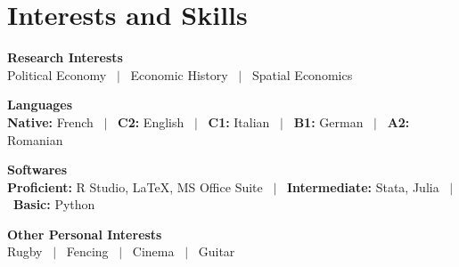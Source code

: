 \documentclass[a4paper,11pt]{article}
\begin{document}
\section{Interests and Skills}

\noindent
\newline
\textbf{Research Interests} \\
Political Economy \ $|$ \ Economic History \ $|$ \ Spatial Economics 

\noindent
\textbf{Languages} \\
\textbf{Native:} French \ $|$ \ \textbf{C2:} English \ $|$ \ \textbf{C1:} Italian \ $|$ \ \textbf{B1:} German \ $|$ \ \textbf{A2:} Romanian

\noindent
\textbf{Softwares} \\
\textbf{Proficient:} R Studio, \LaTeX, MS Office Suite \ $|$ \ \textbf{Intermediate:} Stata, Julia \ $|$ \ \textbf{Basic:} Python 

\noindent
\textbf{Other Personal Interests} \\
Rugby \ $|$ \ Fencing \ $|$ \ Cinema \ $|$ \ Guitar

\vfill
{}
\end{document}
